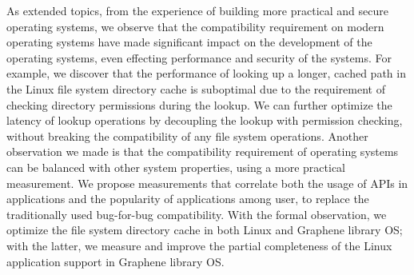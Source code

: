 As extended topics,
from the experience of building more practical and secure operating systems,
we observe that the compatibility requirement on modern operating systems have made significant impact
on the development of the operating systems,
even effecting performance and security of the systems.
For example, we discover that the performance of looking up a longer, cached path in the Linux file system directory cache
is suboptimal due to the requirement of checking directory permissions during the lookup.
We can further optimize the latency of lookup operations
by decoupling the lookup with permission checking,
without breaking the compatibility of any file system operations.
Another observation we made is that
the compatibility requirement of operating systems can be balanced with other system properties,
using a more practical measurement.
We propose measurements that correlate both the usage of APIs in applications
and the popularity of applications among user,
to replace the traditionally used bug-for-bug compatibility.
With the formal observation, we optimize the file system directory cache in both Linux and Graphene library OS;
with the latter, we measure and improve the partial completeness of the Linux application support in Graphene library OS. 


